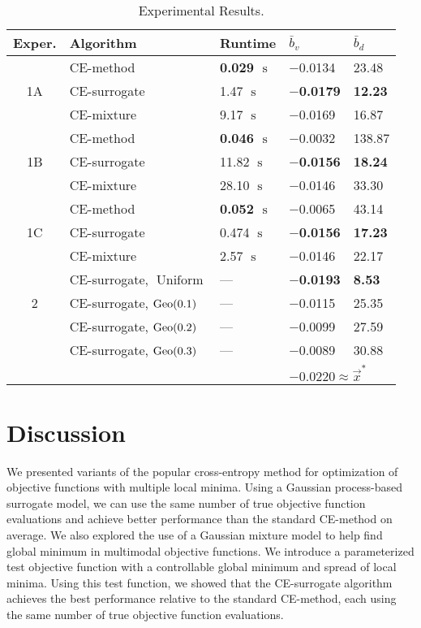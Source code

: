 \begin{table}[!ht]
    \small
    \centering
    \caption{\label{tab:cem_results} Experimental Results.}
    \begin{tabular}{cllll}
    \toprule
    \textbf{Exper.} & \textbf{Algorithm} & \textbf{Runtime} & $\bar{b}_v$ & $\bar{b}_d$\\
    \midrule
    \multirow{3}{*}{1A} & CE-method & \textbf{0.029 $\operatorname{s}$} & $-$0.0134 & 23.48\\
    &CE-surrogate & 1.47 $\operatorname{s}$ & \textbf{\boldmath$-$0.0179} & \textbf{12.23}\\
    &CE-mixture & 9.17 $\operatorname{s}$ & $-$0.0169 & 16.87\\
    \midrule
    \multirow{3}{*}{1B} & CE-method & \textbf{0.046 $\operatorname{s}$} & $-$0.0032 & 138.87\\
    &CE-surrogate & 11.82 $\operatorname{s}$ & \textbf{\boldmath$-$0.0156} & \textbf{18.24}\\
    &CE-mixture & 28.10 $\operatorname{s}$ & $-$0.0146 & 33.30\\
    \midrule
    \multirow{3}{*}{1C} & CE-method & \textbf{0.052 $\operatorname{s}$} & $-$0.0065 & 43.14\\
    &CE-surrogate & 0.474 $\operatorname{s}$ & \textbf{\boldmath$-$0.0156} & \textbf{17.23}\\
    &CE-mixture & 2.57 $\operatorname{s}$ & $-$0.0146 & 22.17\\
    \midrule
    \multirow{3}{*}{2} & CE-surrogate, $\operatorname{Uniform}$ & --- & \textbf{\boldmath$-$0.0193} & \textbf{8.53}\\
    &CE-surrogate, $\operatorname{Geo}(0.1)$ & {\color{gray}---} & $-$0.0115 & 25.35\\
    &CE-surrogate, $\operatorname{Geo}(0.2)$ & {\color{gray}---} & $-$0.0099 & 27.59\\
    &CE-surrogate, $\operatorname{Geo}(0.3)$ & {\color{gray}---} & $-$0.0089 & 30.88\\
    \bottomrule
    & & & \multicolumn{2}{l}{$-\text{0.0220} \approx\vec{x}^*$}\\
    \end{tabular}
\end{table}


\section{Discussion} \label{sec:cem_discussion}
We presented variants of the popular cross-entropy method for optimization of objective functions with multiple local minima.
Using a Gaussian process-based surrogate model, we can use the same number of true objective function evaluations and achieve better performance than the standard CE-method on average.
We also explored the use of a Gaussian mixture model to help find global minimum in multimodal objective functions.
We introduce a parameterized test objective function with a controllable global minimum and spread of local minima.
Using this test function, we showed that the CE-surrogate algorithm achieves the best performance relative to the standard CE-method, each using the same number of true objective function evaluations.


